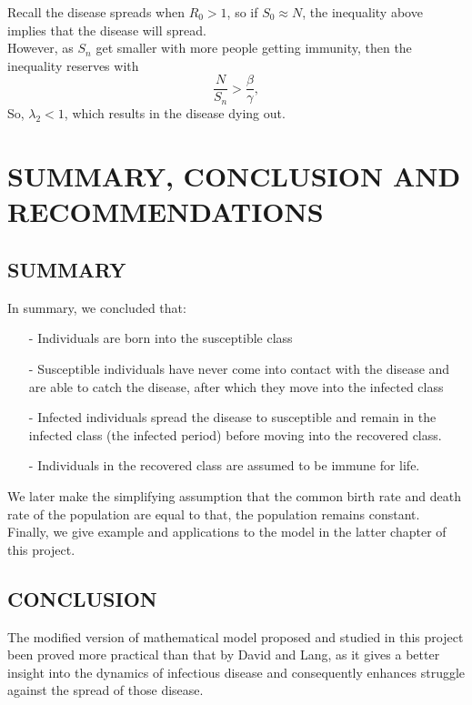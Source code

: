 \documentclass[12pt]{report}
\newcommand{\sps}{\\[0.2cm]}
\newcommand{\NI}{\noindent}
\begin{document}
	\NI Recall the disease spreads when $R_0 > 1$, so if $S_0 \approx N$, the inequality above implies that the disease will spread.\sps
	However, as $S_n$ get smaller with more people getting immunity, then the inequality reserves with
	\begin{equation*}
		\frac{N}{S_n} > \frac{\beta}{\gamma},
	\end{equation*}
	So, $\lambda_2 < 1$, which results in the disease dying out.
		
	
	\chapter{SUMMARY, CONCLUSION AND RECOMMENDATIONS}
	
	\section{SUMMARY}
	In summary, we concluded that:
	\begin{itemize}
		\item[-] Individuals are born into the susceptible class
		
		\item[-] Susceptible individuals have never come into contact with the disease and are able to catch the disease, after which they move into the infected class
		
		\item[-] Infected individuals spread the disease to susceptible and remain in the infected class (the infected period) before moving into the recovered class.
		
		\item[-] Individuals in the recovered class are assumed to be immune for life.
	\end{itemize}
	
	\NI We later make the simplifying assumption that the common birth rate and death rate of the population are equal to that, the population remains constant.\\
	
	\NI Finally, we give example and applications to the model in the latter chapter of this project.
	
	\section{CONCLUSION}
	The modified version of mathematical model proposed and studied in this project been proved more practical than that by David and Lang, as it gives a better insight into the dynamics of infectious disease and consequently enhances struggle against the spread of those disease.\\
	
\end{document}
